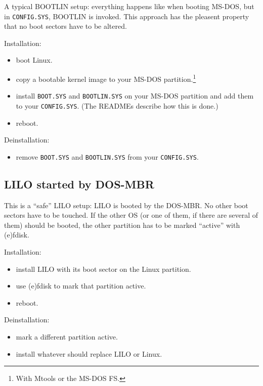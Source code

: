 A typical BOOTLIN setup: everything happens like when booting MS-DOS, but in
{\tt CONFIG.SYS},
BOOTLIN is invoked. This approach has the pleasent property that no boot
sectors have to be altered.

Installation:
\begin{itemize}
  \item boot Linux.
  \item copy a bootable kernel image to your MS-DOS partition.\footnote{%
    With Mtools or the MS-DOS FS.}
  \item install {\tt BOOT.SYS} and {\tt BOOTLIN.SYS} on your MS-DOS
    partition and add them to your {\tt CONFIG.SYS}.
    (The READMEs describe how this is done.)
  \item reboot.
\end{itemize}

Deinstallation:
\begin{itemize}
  \item remove {\tt BOOT.SYS} and {\tt BOOTLIN.SYS} from your {\tt CONFIG.SYS}.
\end{itemize}


\subsection{LILO started by DOS-MBR}


This is a ``safe'' LILO setup: LILO is booted by the DOS-MBR. No other boot
sectors have to be touched. If the other OS (or one of them, if there are
several of them) should be booted, the other partition has to be marked
``active'' with (e)fdisk.

Installation:
\begin{itemize}
  \item install LILO with its boot sector on the Linux partition.
  \item use (e)fdisk to mark that partition active.
  \item reboot.
\end{itemize}

Deinstallation:
\begin{itemize}
  \item mark a different partition active.
  \item install whatever should replace LILO or Linux.
\end{itemize}


